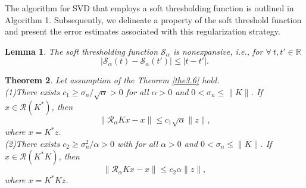 \documentclass[a4paper,12pt]{article}
\newtheorem{theorem}{Theorem}[section]
\newtheorem{lemma}[theorem]{Lemma}
\numberwithin{equation}{section}
\begin{document}
\par The algorithm for SVD that employs a soft thresholding function is outlined in Algorithm 1. Subsequently, we delineate a property of the soft threshold function \cite[Lemma 2.2]{DDD04} and present the error estimates associated with this regularization strategy.

\begin{lemma}\label{lem3.7}
    The soft thresholding function $\mathcal{S}_{\alpha}$ is nonexpansive, i.e., for $\forall\ t,t'\in\mathbb{R}$
    \begin{equation*}
        \left|\mathcal{S}_{\alpha}\left(t\right)-\mathcal{S}_{\alpha}\left(t'\right)\right| \leq \left|t-t'\right|.
    \end{equation*} 
\end{lemma}

\begin{algorithm}
\caption{SVD algorithm for the $\ell^{1}$-SVD regularization strategy}
\begin{algorithmic}\label{alg1}

\end{algorithmic}
\end{algorithm}

\begin{theorem}\label{the3.8}
   Let assumption of the Theorem \ref{the3.6} hold. \\
   (1)There exists $c_{1}\geq\sigma_{n}/\sqrt{\alpha}>0$ for all $\alpha>0$ and $0<\sigma_{n}\leq\|K\|$. If $x\in\mathcal{R}(K^{*})$, then
   \begin{equation}\label{3.16}
       \|\mathcal{R}_{\alpha}Kx-x\|\leq c_{1}\sqrt{\alpha}\|z\|,
   \end{equation}
   where $x=K^{*}z$. \\
   (2)There exists $c_{2}\geq\sigma_{n}^{2}/\alpha>0$ with for all $\alpha>0$ and $0<\sigma_{n}\leq\|K\|$. If $x\in\mathcal{R}(K^{*}K)$, then
   \begin{equation}\label{equ3.17}
       \|\mathcal{R}_{\alpha}Kx-x\|\leq c_{2}\alpha\|z\|,
   \end{equation}
   where $x=K^{*}Kz$.
\end{theorem}
\end{document}
